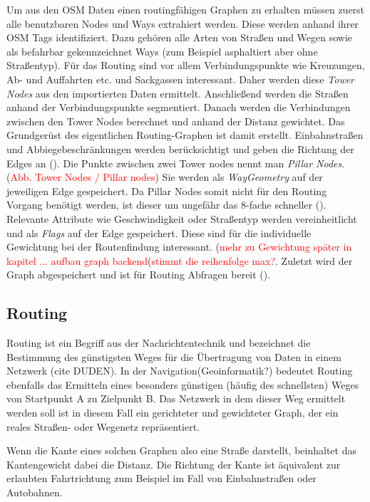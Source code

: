 \documentclass[10pt,a4paper]{article}
\newcommand\todo[1]{\textcolor{red}{#1}}
\begin{document}
Um aus den OSM Daten einen routingfähigen Graphen zu erhalten müssen zuerst alle benutzbaren Nodes und Ways extrahiert werden. Diese werden anhand ihrer OSM Tags identifiziert. Dazu gehören alle Arten von Straßen und Wegen sowie als befahrbar gekennzeichnet Ways (zum Beispiel asphaltiert aber ohne Straßentyp). Für das Routing sind vor allem Verbindungspunkte wie Kreuzungen, Ab- und Auffahrten etc. und Sackgassen interessant. Daher werden diese \textit{Tower Nodes} aus den importierten Daten ermittelt. Anschließend werden die Straßen anhand der Verbindungspunkte segmentiert. Danach werden die Verbindungen zwischen den Tower Nodes berechnet und anhand der Distanz gewichtet. Das Grundgerüst des eigentlichen Routing-Graphen ist damit erstellt. Einbahnstraßen und Abbiegebeschränkungen werden berücksichtigt und geben die Richtung der Edges an (\cite{osmgraph}). Die Punkte zwischen zwei Tower nodes nennt man \textit{Pillar Nodes}.(\todo{Abb. Tower Nodes / Pillar nodes}) Sie werden als \textit{WayGeometry} auf der jeweiligen Edge gespeichert. Da Pillar Nodes somit nicht für den Routing Vorgang benötigt werden, ist dieser um ungefähr das 8-fache schneller (\cite{graphhopper}). Relevante Attribute wie Geschwindigkeit oder Straßentyp werden vereinheitlicht und als \textit{Flags} auf der Edge gespeichert. Diese sind für die individuelle Gewichtung bei der Routenfindung interessant.  (\todo{mehr zu Gewichtung später in kapitel ... aufbau graph backend}(\todo{stimmt die reihenfolge max?}. Zuletzt wird der Graph abgespeichert und ist für Routing Abfragen bereit (\cite{osmgraph}). 

\subsection{Routing}

Routing ist ein Begriff aus der Nachrichtentechnik und bezeichnet die Bestimmung des günstigsten Weges für die Übertragung von Daten in einem Netzwerk (cite DUDEN). In der Navigation(Geoinformatik?) bedeutet Routing ebenfalls das Ermitteln eines besonders günstigen (häufig des schnellsten) Weges von Startpunkt A zu Zielpunkt B. Das Netzwerk in dem dieser Weg ermittelt werden soll ist in diesem Fall ein gerichteter und gewichteter Graph, der ein reales Straßen- oder Wegenetz repräsentiert.

Wenn die Kante eines solchen Graphen also eine Straße darstellt, beinhaltet das Kantengewicht dabei die Distanz. Die Richtung der Kante ist äquivalent zur erlaubten Fahrtrichtung zum Beispiel im Fall von Einbahnstraßen oder Autobahnen.
\end{document}
